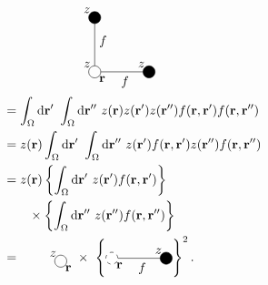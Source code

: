 \documentclass[8.5pt,twoside,twocolumn]{article}
\newcommand\di{\te{d}}
\newcommand\dr{\di\r}
\newcommand\drr{\di\r\ }
\renewcommand\r{\bo r}
\theoremstyle{standard}
\begin{document}
\begin{align}
\begin{aligned}
&\qquad\qquad\qquad\begin{tikzpicture}[baseline={(current bounding box.center)}]%
  	\draw (0,0) node[circle,minimum size=0.2cm,draw,fill=white, fill opacity=0] (A) {};
  	\draw (0,1.5) node[circle,minimum size=0.2cm,draw,fill=black] (B) {};
  	\draw (1.5,0) node[circle,minimum size=0.2cm,draw,fill=black] (C) {};
  	\draw (A.north) --  node[right]{$f$}(B.center);
  	\draw (A.east) --  node[below]{$f$}(C.center);
  	\node [above left] at (A) {$z$};
	\node [above left] at (B) {$z$};
	\node [above left] at (C) {$z$};
  	\node [below right] at (A) {\r};
\end{tikzpicture} \\
&= \int_\Om \dr'\ \int_\Om \dr''\ z(\r) z(\r') z(\r'') f(\r,\r') f(\r,\r'') \\
&= z(\r) \int_\Om \dr'\ \int_\Om \dr''\ z(\r') f(\r,\r') z(\r'') f(\r,\r'') \\
&= z(\r) \brc{\int_\Om \dr'\  z(\r') f(\r,\r')} \\
&\qquad\times \brc{\int_\Om \dr''\ z(\r'') f(\r,\r'')} \\
&=\qquad\begin{tikzpicture}[baseline={(current bounding box.center)}]%
  	\draw (0,0) node[circle,minimum size=0.2cm,draw,fill=white, fill opacity=0] (A) {};
  	\node [below right] at (A) {\r};
  	\node [above left] at (A) {$z$};
\end{tikzpicture}
\times \
\brc{\begin{tikzpicture}[baseline={(current bounding box.center)}]%
  	\draw (0,0) node[circle,minimum size=0.2cm,draw,fill=white,dashed] (A) {};
  	\draw (1.5,0) node[circle,minimum size=0.2cm,draw,fill=black] (B) {};
  	\node [above left] at (B) {$z$};
  	\draw (A.east) --  node[below]{$f$}(B.center);
  	\node [below right] at (A) {\r};
\end{tikzpicture}}^2.
\end{aligned}
\label{articul:ex}
\end{align}
\end{document}
